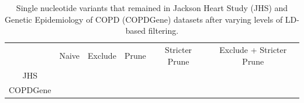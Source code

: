 \documentclass[12pt]{article}
\newcommand{\add}[1]{{\color{red}{[... #1 ...]}}}
\begin{document}
\begin{table}[h]
\label{tab:N}
\begin{tabular}{c|ccccc}
 & Naive & Exclude & Prune & Stricter Prune & Exclude + Stricter Prune \\
JHS & \add{?} &  \add{?} &  \add{?} & \add{?} &  \add{?} \\
COPDGene &  \add{?} &  \add{?} &  \add{?} &  \add{?} &  \add{?} \\
\end{tabular} 
\caption{Single nucleotide variants that remained in Jackson Heart Study (JHS) and Genetic Epidemiology of COPD (COPDGene) datasets after varying levels of LD-based filtering.}
\end{table}


%
\end{document}
